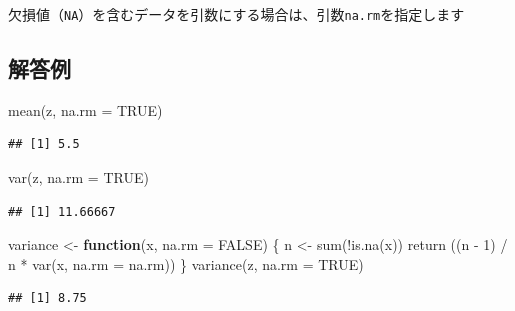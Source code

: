 \documentclass[
  12pt,
]{book}
\newenvironment{Shaded}{\begin{snugshade}}{\end{snugshade}}
\newcommand{\AttributeTok}[1]{\textcolor[rgb]{0.77,0.63,0.00}{#1}}
\newcommand{\ConstantTok}[1]{\textcolor[rgb]{0.00,0.00,0.00}{#1}}
\newcommand{\ControlFlowTok}[1]{\textcolor[rgb]{0.13,0.29,0.53}{\textbf{#1}}}
\newcommand{\DecValTok}[1]{\textcolor[rgb]{0.00,0.00,0.81}{#1}}
\newcommand{\FunctionTok}[1]{\textcolor[rgb]{0.00,0.00,0.00}{#1}}
\newcommand{\NormalTok}[1]{#1}
\newcommand{\OtherTok}[1]{\textcolor[rgb]{0.56,0.35,0.01}{#1}}
\newcommand{\SpecialCharTok}[1]{\textcolor[rgb]{0.00,0.00,0.00}{#1}}
\begin{document}
\begin{hint-box}
欠損値（\texttt{NA}）を含むデータを引数にする場合は、引数\texttt{na.rm}を指定します

\end{hint-box}

\hypertarget{ux89e3ux7b54ux4f8b-1}{%
\subsection*{解答例}\label{ux89e3ux7b54ux4f8b-1}}

\begin{Shaded}
\begin{Highlighting}[numbers=left,,]
\FunctionTok{mean}\NormalTok{(z, }\AttributeTok{na.rm =} \ConstantTok{TRUE}\NormalTok{)}
\end{Highlighting}
\end{Shaded}

\begin{verbatim}
## [1] 5.5
\end{verbatim}

\begin{Shaded}
\begin{Highlighting}[numbers=left,,]
\FunctionTok{var}\NormalTok{(z, }\AttributeTok{na.rm =} \ConstantTok{TRUE}\NormalTok{)}
\end{Highlighting}
\end{Shaded}

\begin{verbatim}
## [1] 11.66667
\end{verbatim}

\begin{Shaded}
\begin{Highlighting}[numbers=left,,]
\NormalTok{variance }\OtherTok{\textless{}{-}} \ControlFlowTok{function}\NormalTok{(x, }\AttributeTok{na.rm =} \ConstantTok{FALSE}\NormalTok{) \{}
\NormalTok{  n }\OtherTok{\textless{}{-}} \FunctionTok{sum}\NormalTok{(}\SpecialCharTok{!}\FunctionTok{is.na}\NormalTok{(x))}
  \FunctionTok{return}\NormalTok{ ((n }\SpecialCharTok{{-}} \DecValTok{1}\NormalTok{) }\SpecialCharTok{/}\NormalTok{ n }\SpecialCharTok{*} \FunctionTok{var}\NormalTok{(x, }\AttributeTok{na.rm =}\NormalTok{ na.rm))}
\NormalTok{\}}
\FunctionTok{variance}\NormalTok{(z, }\AttributeTok{na.rm =} \ConstantTok{TRUE}\NormalTok{)}
\end{Highlighting}
\end{Shaded}

\begin{verbatim}
## [1] 8.75
\end{verbatim}
\end{document}
